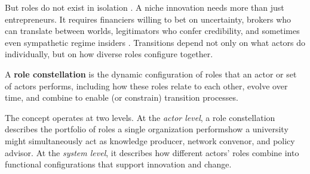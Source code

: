 \documentclass[../main.tex]{subfiles}
\begin{document}
But roles do not exist in isolation \cite{padgett2012emergence}. A niche innovation needs more than just entrepreneurs. It requires financiers willing to bet on uncertainty, brokers who can translate between worlds, legitimators who confer credibility, and sometimes even sympathetic regime insiders \cite{schot2018three,suchman1995managing}. Transitions depend not only on what actors do individually, but on how diverse roles configure together.

\begin{roledef}
A \textbf{role constellation} is the dynamic configuration of roles that an actor or set of actors performs, including how these roles relate to each other, evolve over time, and combine to enable (or constrain) transition processes.
\end{roledef}

The concept operates at two levels. At the \emph{actor level}, a role constellation describes the portfolio of roles a single organization performs\textemdash how a university might simultaneously act as knowledge producer, network convenor, and policy advisor. At the \emph{system level}, it describes how different actors' roles combine into functional configurations that support innovation and change.
\end{document}
